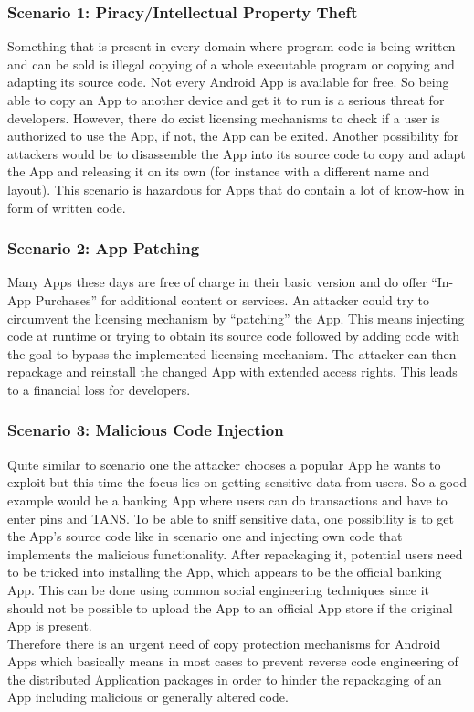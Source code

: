 \subsubsection*{Scenario 1: Piracy/Intellectual Property Theft}\label{section:scenario_1}
Something that is present in every domain where program code is being written
and can be sold is illegal copying of a whole executable program or copying and adapting its source code.
Not every Android App is available for free. So being
able to copy an App to another device and get it to run is a serious threat for developers. However, there do exist licensing mechanisms to check if a user is
authorized to use the App, if not, the App can be exited.
Another possibility for attackers would be to disassemble
the App into its source code to copy and adapt the App and releasing it on its own (for instance with a different name and layout).
This scenario is hazardous for Apps that do contain a lot of know-how in form of written code.


\subsubsection*{Scenario 2: App Patching}\label{section:scenario_2}
Many Apps these days are free of charge in their basic version and
do offer ``In-App Purchases'' for additional content or services.
An attacker could try to circumvent the licensing mechanism by ``patching'' the App. This means injecting code at runtime or trying to obtain its source code followed by adding code with the goal to bypass the implemented licensing
mechanism. The attacker can then repackage and reinstall the changed App
with extended access rights. This leads to a financial loss for developers.

\subsubsection*{Scenario 3: Malicious Code Injection}\label{section:scenario_3}
Quite similar to scenario one the attacker chooses a popular App he wants to exploit but this time the focus lies on getting sensitive data from users.
So a good example would be a banking App where users can do transactions and have to enter pins and TANS.
To be able to sniff sensitive data, one possibility is to get the App’s source code like in scenario one and injecting own code that implements the malicious functionality. After repackaging it, potential users need to be tricked into installing the App, which appears to be the official banking App. This can be done using common social engineering techniques since it should not be possible to upload the App to an official App store if the original App is present.\\

Therefore there is an urgent need of copy protection mechanisms
for Android Apps which basically means in most cases to prevent reverse code engineering of the distributed Application packages in order to hinder the repackaging of an App including malicious or generally altered code.
